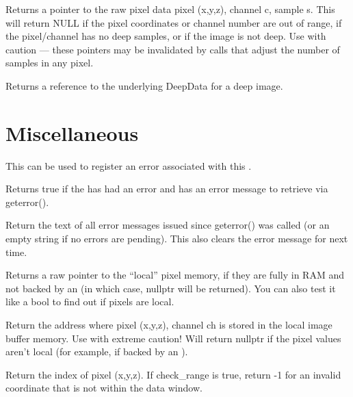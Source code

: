 Returns a pointer to the raw pixel data pixel {\cf (x,y,z)}, channel {\cf c},
sample {\cf s}.  This will return {\cf NULL} if the pixel
coordinates or channel number are out of range, if the pixel/channel has
no deep samples, or if the image is not deep. Use with caution --- these
pointers may be invalidated by calls that adjust the number of samples in
any pixel.
\apiend

Returns a reference to the underlying {\cf DeepData} for a deep image.
\apiend


\section{Miscellaneous}

This can be used to register an error associated with this \ImageBuf.
\apiend

Returns {\cf true} if the \ImageBuf has had an error and has an error
message to retrieve via {\cf geterror()}.
\apiend

Return the text of all error messages issued since {\cf geterror()} was
called (or an empty string if no errors are pending).  This also
clears the error message for next time.
\apiend

Returns a raw pointer to the ``local'' pixel memory, if they are fully
in RAM and not backed by an \ImageCache (in which case, {\cf nullptr} will
be returned).  You can also test it like a {\cf bool} to find out if
pixels are local.
\apiend

Return the address where pixel {\cf (x,y,z)}, channel {\cf ch} is stored in
the local image buffer memory.
Use with extreme caution!  Will return {\cf nullptr} if the pixel values
aren't local (for example, if backed by an \ImageCache).
\apiend

Return the index of pixel (x,y,z). If {\cf check_range} is {\cf true},
return -1 for an invalid coordinate that is not within the data window.
\apiend

